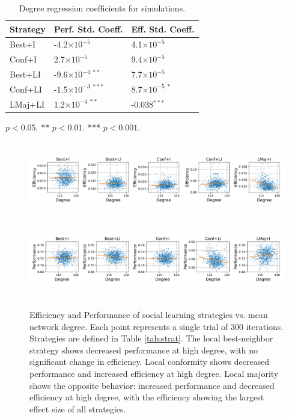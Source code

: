 \documentclass[letterpaper,twocolumn,10pt]{article}
\newcommand{\+}{\phantom{-}}
\begin{document}
\begin{table}
\small
\centering
\begin{tabular}{lll}
Strategy & Perf. Std. Coeff. & Eff. Std. Coeff.\\
\hline
Best+I  & -4.2$\times{10^{-5}}$ & \+4.1$\times{10^{-5}}$ \\
Conf+I  & \+2.7$\times{10^{-5}}$ & \+9.4$\times{10^{-5}}$ \\
Best+LI & -9.6$\times{10^{-4\;**}}$ & \+7.7$\times{10^{-5}}$ \\
Conf+LI & -1.5$\times{10^{-3\;***}}$ & \+8.7$\times{10^{-5\;*}}$ \\
LMaj+LI & \+1.2$\times{10^{-4\;**}}$ & -0.038$^{***}$ \\
\hline
\end{tabular}
\begin{tablenotes}
\item \centering * $p < 0.05$. ** $p < 0.01$. *** $p < 0.001$.
\end{tablenotes}
\caption{
Degree regression coefficients for simulations.
\label{tab:sim-perf}
}
\end{table}

\begin{figure}
\includegraphics[width=6.67in,height=1.33in]{fig-deg-eff.pdf}
\includegraphics[width=6.67in,height=1.33in]{fig-deg-perf.pdf}
\caption{
Efficiency and Performance of social learning strategies vs. mean network degree.
Each point represents a single trial of 300 iterations.
Strategies are defined in Table \ref{tab:strat}.
The local best-neighbor strategy shows
decreased performance at high degree,
with no significant change in efficiency.
Local conformity shows decreased performance and increased efficiency at high
degree.
Local majority shows the opposite behavior:
increased performance and decreased efficiency at high degree,
with the efficiency showing the largest effect size of all strategies.
\label{fig:deg-eff-perf}
}
\end{figure}
\end{document}
